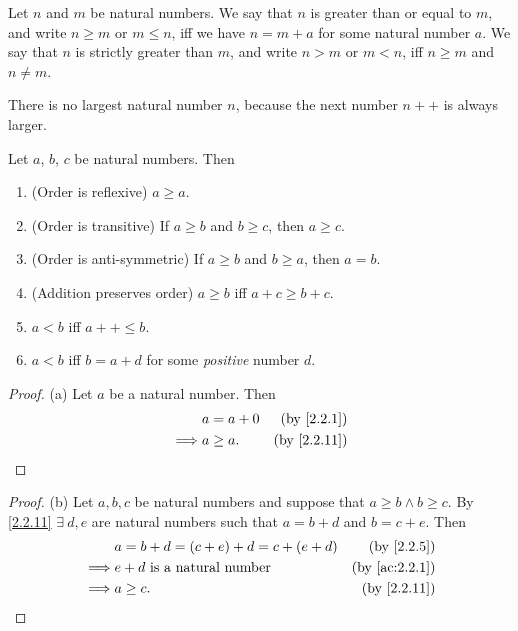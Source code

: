 \begin{defn}\label{2.2.11}
  Let \(n\) and \(m\) be natural numbers.
  We say that \(n\) is greater than or equal to \(m\), and write \(n \geq m\) or \(m \leq n\), iff we have \(n = m + a\) for some natural number \(a\).
  We say that \(n\) is strictly greater than \(m\), and write \(n > m\) or \(m < n\), iff \(n \geq m\) and \(n \neq m\).
\end{defn}

\begin{note}
  There is no largest natural number \(n\), because the next number \(n++\) is always larger.
\end{note}

\begin{prop}\label{2.2.12}
  Let \(a\), \(b\), \(c\) be natural numbers.
  Then
  \begin{enumerate}
    \item (Order is reflexive) \(a \geq a\).
    \item (Order is transitive) If \(a \geq b\) and \(b \geq c\), then \(a \geq c\).
    \item (Order is anti-symmetric) If \(a \geq b\) and \(b \geq a\), then \(a = b\).
    \item (Addition preserves order) \(a \geq b\) iff \(a + c \geq b + c\).
    \item \(a < b\) iff \(a++ \leq b\).
    \item \(a < b\) iff \(b = a + d\) for some \emph{positive} number \(d\).
  \end{enumerate}
\end{prop}

\begin{proof}{(a)}
  Let \(a\) be a natural number.
  Then
  \begin{align*}
             & a = a + 0 & \text{(by \cref{2.2.1})}  \\
    \implies & a \geq a. & \text{(by \cref{2.2.11})}
  \end{align*}
\end{proof}

\begin{proof}{(b)}
  Let \(a, b, c\) be natural numbers and suppose that \(a \geq b \land b \geq c\).
  By \cref{2.2.11} \(\exists\ d, e\) are natural numbers such that \(a = b + d\) and \(b = c + e\).
  Then
  \begin{align*}
             & a = b + d = (c + e) + d = c + (e + d) & \text{(by \cref{2.2.5})}    \\
    \implies & e + d \text{ is a natural number}     & \text{(by \cref{ac:2.2.1})} \\
    \implies & a \geq c.                             & \text{(by \cref{2.2.11})}   \\
  \end{align*}
\end{proof}

